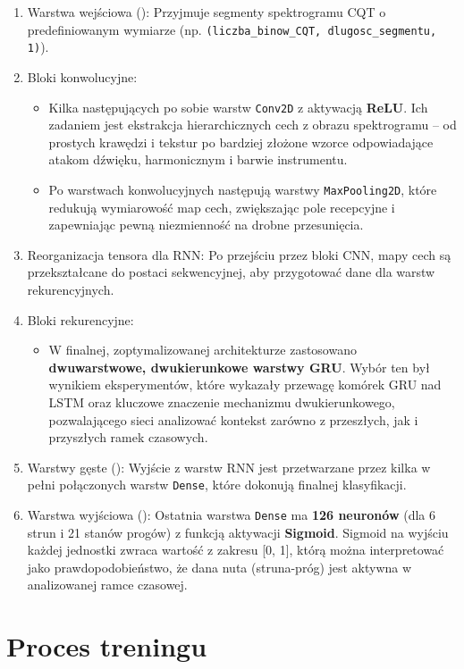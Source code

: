 \begin{enumerate}
    \item Warstwa wejściowa (): Przyjmuje segmenty spektrogramu CQT o predefiniowanym wymiarze (np. \texttt{(liczba\_binow\_CQT, dlugosc\_segmentu, 1)}).
    \item Bloki konwolucyjne:
    \begin{itemize}
        \item Kilka następujących po sobie warstw \texttt{Conv2D} z aktywacją \textbf{ReLU}. Ich zadaniem jest ekstrakcja hierarchicznych cech z obrazu spektrogramu – od prostych krawędzi i tekstur po bardziej złożone wzorce odpowiadające atakom dźwięku, harmonicznym i barwie instrumentu.
        \item Po warstwach konwolucyjnych następują warstwy \texttt{MaxPooling2D}, które redukują wymiarowość map cech, zwiększając pole recepcyjne i zapewniając pewną niezmienność na drobne przesunięcia.
    \end{itemize}
    \item Reorganizacja tensora dla RNN: Po przejściu przez bloki CNN, mapy cech są przekształcane do postaci sekwencyjnej, aby przygotować dane dla warstw rekurencyjnych.
    \item Bloki rekurencyjne:
    \begin{itemize}
        \item W finalnej, zoptymalizowanej architekturze zastosowano \textbf{dwuwarstwowe, dwukierunkowe warstwy GRU}. Wybór ten był wynikiem eksperymentów, które wykazały przewagę komórek GRU nad LSTM oraz kluczowe znaczenie mechanizmu dwukierunkowego, pozwalającego sieci analizować kontekst zarówno z przeszłych, jak i przyszłych ramek czasowych.
    \end{itemize}
    \item Warstwy gęste (): Wyjście z warstw RNN jest przetwarzane przez kilka w pełni połączonych warstw \texttt{Dense}, które dokonują finalnej klasyfikacji.
    \item Warstwa wyjściowa (): Ostatnia warstwa \texttt{Dense} ma \textbf{126 neuronów} (dla 6 strun i 21 stanów progów) z funkcją aktywacji \textbf{Sigmoid}. Sigmoid na wyjściu każdej jednostki zwraca wartość z zakresu [0, 1], którą można interpretować jako prawdopodobieństwo, że dana nuta (struna-próg) jest aktywna w analizowanej ramce czasowej.
\end{enumerate}

\section*{Proces treningu}
\label{sec:tech_trening}

